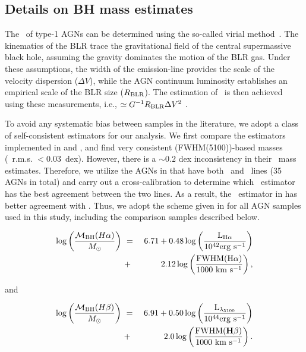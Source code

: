 \documentclass[apj]{emulateapj}
\begin{document}
\subsection{Details on BH mass estimates}
\label{mbh}

The \mbh\ of type-1 AGNs can be determined using the so-called virial method~\citep{Peterson2004, Shen2013}. The kinematics of the BLR trace the gravitational field of the central supermassive black hole, assuming the gravity dominates the motion of the BLR gas. Under these assumptions, the width of the emission-line provides the scale of the velocity dispersion ($\Delta V$), while the AGN continuum luminosity establishes an empirical scale of the BLR size ($R_{\rm BLR}$). The estimation of \mbh\ is then achieved using these measurements, i.e., \mbh$\simeq G^{-1} R_{\rm BLR} \Delta V^2$ \citep{McLure2004}.

To avoid any systematic bias between samples in the literature, we adopt a class of self-consistent estimators for our analysis. We first compare the estimators implemented in \citet{Schulze2018} and \citet{Ding2017b}, and find very consistent \hbeta(FWHM(5100))-based masses (\mbh\ r.m.s. $<0.03$~dex). However, there is a $\sim0.2$ dex inconsistency in their \halpha\ mass estimates. Therefore, we utilize the AGNs in \citet{Schulze2018} that have both \halpha\ and \hbeta\ lines (35 AGNs in total) and carry out a cross-calibration to determine which \halpha\ estimator has the best agreement between the two lines. As a  result, the \halpha\ estimator in \citet{Schulze2018} has better agreement with \hbeta. Thus, we adopt the scheme given in \citet{Schulze2018} for all AGN samples used in this study, including the comparison samples described below.

\begin{eqnarray}
\label{eq:Ha}
\log \left(\frac{\mathcal M_{\rm BH} (H\alpha)}{M_{\odot}}\right)&~=~& 6.71+0.48 \log \left(\frac{ \rm L _{H\alpha}}{10^{42}{\rm erg~s^{-1}}}\right) \nonumber\\
&~+~& 2.12 \log \left(\frac{\rm FWHM(H\alpha)}{1000 ~{\rm km~s^{-1}}}\right) ,
\end {eqnarray}

and

\begin{eqnarray}
\label{eq:Hb}
\log \left(\frac{\mathcal M_{\rm BH}(H\beta) }{M_{\odot}}\right)&~=~& 6.91+0.50\log \left(\frac{ \rm L _{\lambda_{5100}}}{10^{44}{\rm erg~s^{-1}}}\right) \nonumber\\
&~+~& 2.0 \log \left(\frac{\rm FWHM({\bf H\beta })}{1000 ~{\rm km~s^{-1}}}\right) .
\end {eqnarray}
\end{document}

